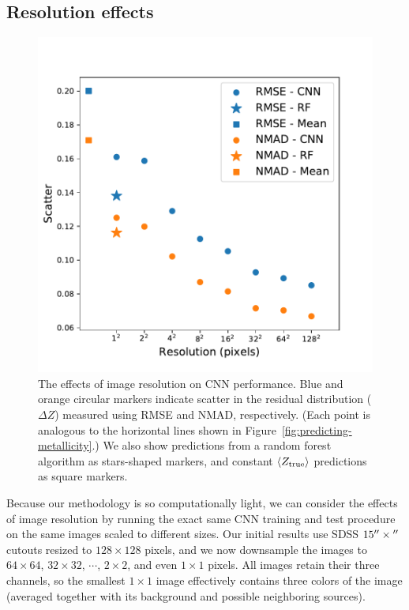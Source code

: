 \documentclass[fleqn,usenatbib]{mnras}
\begin{document}
\subsection{Resolution effects} \label{sec:resolution}



\begin{figure}
	\includegraphics[width=\columnwidth]{04-resolution.pdf}
	\caption{\label{fig:resolution}
		The effects of image resolution on CNN performance.
		Blue and orange circular markers indicate scatter in the residual distribution ($\Delta Z$) measured using RMSE and NMAD, respectively.
		(Each point is analogous to the horizontal lines shown in Figure~\ref{fig:predicting-metallicity}.)
		We also show predictions from a random forest algorithm as stars-shaped markers, and constant $\langle Z_{\rm true}\rangle$ predictions as square markers.
	}
\end{figure}

Because our methodology is so computationally light, we can consider the effects of image resolution by running the exact same CNN training and test procedure on the same images scaled to different sizes.
Our initial results use SDSS $15\hbox{$^{\prime\prime}$} \times \hbox{$^{\prime\prime}$}$ cutouts resized to $128\times 128$ pixels, and we now downsample the images to $64\times 64$, $32 \times 32$, $\cdots$, $2\times 2$, and even $1\times 1$ pixels.
All images retain their three channels, so the smallest $1 \times 1$ image effectively contains three colors of the image (averaged together with its background and possible neighboring sources).
\end{document}
